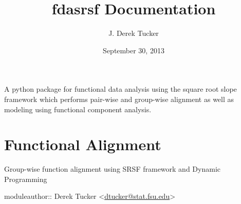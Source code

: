 \documentclass[letterpaper,10pt,english]{sphinxmanual}
\title{fdasrsf Documentation}
\date{September 30, 2013}
\author{J. Derek Tucker}
\begin{document}
\maketitle
\tableofcontents
{}\label{index::doc}


A python package for functional data analysis using the square root slope framework which performs pair-wise and
group-wise alignment as well as modeling using functional component analysis.


\chapter{Functional Alignment}
\label{time_warping:module-time_warping}\label{time_warping:functional-alignment}\label{time_warping::doc}\label{time_warping:welcome-to-fdasrsf-s-documentation}
Group-wise function alignment using SRSF framework and Dynamic Programming

moduleauthor:: Derek Tucker \textless{}\href{mailto:dtucker@stat.fsu.edu}{dtucker@stat.fsu.edu}\textgreater{}
\end{document}
